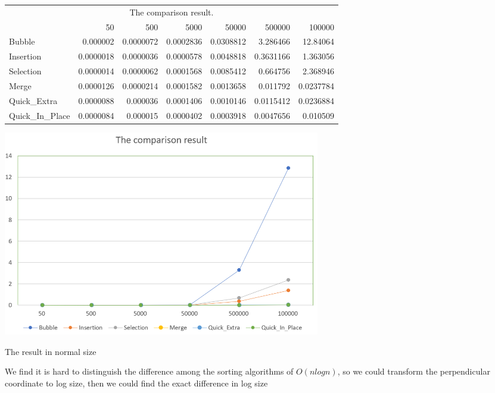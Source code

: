 \documentclass{article}
\begin{document}
\begin{table}[htbp]
  \centering
    \begin{tabular}{l|rrrrrr}
    \multicolumn{7}{c}{The comparison result.} \\
          & 50    & 500   & 5000  & 50000  & 500000  & 100000  \\ \hline
    Bubble & 0.000002 & 0.0000072 & 0.0002836 & 0.0308812 & 3.286466 & 12.84064 \\
    Insertion & 0.0000018 & 0.0000036 & 0.0000578 & 0.0048818 & 0.3631166 & 1.363056 \\
    Selection & 0.0000014 & 0.0000062 & 0.0001568 & 0.0085412 & 0.664756 & 2.368946 \\
    Merge & 0.0000126 & 0.0000214 & 0.0001582 & 0.0013658 & 0.011792 & 0.0237784 \\
    Quick\_Extra & 0.0000088 & 0.000036 & 0.0001406 & 0.0010146 & 0.0115412 & 0.0236884 \\
    Quick\_In\_Place & 0.0000084 & 0.000015 & 0.0000402 & 0.0003918 & 0.0047656 & 0.010509 \\
    \end{tabular}%
  \label{tab:addlabel}%
\end{table}%

\begin{center}
    \includegraphics[height = 9cm]{result1.PNG}
    \caption{The result in normal size}
\end{center}

We find it is hard to distinguish the difference among the sorting algorithms of $O(nlogn)$, so we could transform the perpendicular coordinate to log size, then we could find the exact difference in log size
\end{document}
